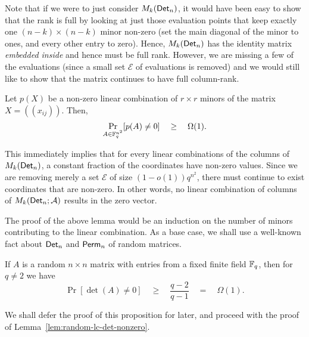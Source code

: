 \documentclass[12pt]{report}
\begin{document}
Note that if we were to just consider $M_k(\mathsf{Det}_n)$, it would have been easy to show that the rank is full by looking at just those evaluation points that keep exactly one $(n-k)\times (n-k)$ minor non-zero (set the main diagonal of the minor to ones, and every other entry to zero). Hence, $M_k(\mathsf{Det}_n)$ has the identity matrix \emph{embedded inside} and hence must be full rank. However, we are missing a few of the evaluations (since a small set $\mathcal{E}$ of evaluations is removed) and we would still like to show that the matrix continues to have full column-rank. 

\begin{lemma}\label{lem:random-lc-det-nonzero}
  Let $p(X)$ be a non-zero linear combination of $r\times r$
  minors of the matrix $X = (\!(x_{ij})\!)$. Then, 
  $$
  \Pr_{A\in \mathbb{F}_q^{n^2}}[p(A) \neq 0] \quad \geq \quad \Omega(1).
  $$
\end{lemma}

This immediately implies that for every linear combinations of the columns of $M_k(\mathsf{Det}_n)$, a constant fraction of the coordinates have non-zero values. Since we are removing merely a set $\mathcal{E}$ of size $(1-o(1))q^{n^2}$, there must continue to exist coordinates that are non-zero. In other words, no linear combination of columns of $M_k(\mathsf{Det}_n;\mathcal{A})$ results in the zero vector. 


The proof of the above lemma would be an induction on the number of minors contributing to the linear combination. As a base case, we shall use a well-known fact about $\mathsf{Det}_n$ and $\mathsf{Perm}_n$ of random matrices. 

\begin{proposition}\label{prop:random-det-nonzero}
  If $A$ is a random $n\times n$ matrix with entries from a fixed
  finite field $\mathbb{F}_q$, then for $q\neq 2$ we have
$$
\Pr[\det(A) \neq 0] \quad\geq\quad \frac{q-2}{q-1} \quad=\quad\Omega(1).
$$
\end{proposition}

We shall defer the proof of this proposition for later, and proceed with the proof of Lemma~\ref{lem:random-lc-det-nonzero}. 
\end{document}
